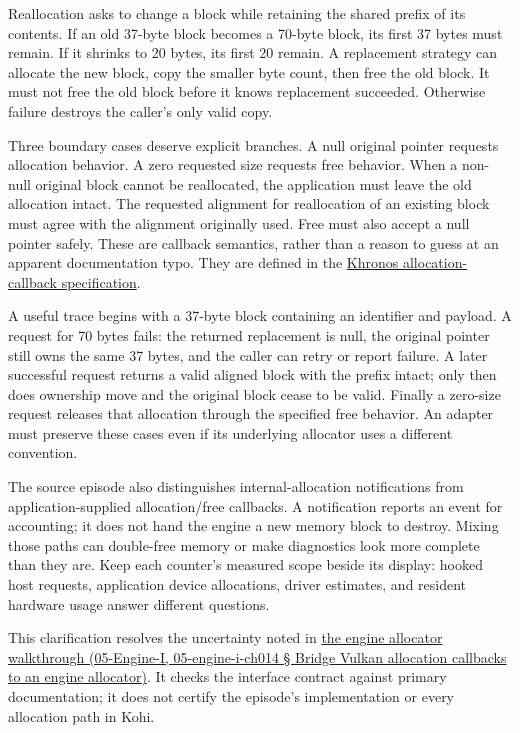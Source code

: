 Reallocation asks to change a block while retaining the shared prefix of its contents. If an old 37-byte block becomes a 70-byte block, its first 37 bytes must remain. If it shrinks to 20 bytes, its first 20 remain. A replacement strategy can allocate the new block, copy the smaller byte count, then free the old block. It must not free the old block before it knows replacement succeeded. Otherwise failure destroys the caller's only valid copy.

Three boundary cases deserve explicit branches. A null original pointer requests allocation behavior. A zero requested size requests free behavior. When a non-null original block cannot be reallocated, the application must leave the old allocation intact. The requested alignment for reallocation of an existing block must agree with the alignment originally used. Free must also accept a null pointer safely. These are callback semantics, rather than a reason to guess at an apparent documentation typo. They are defined in the \href{https://docs.vulkan.org/spec/latest/chapters/memory.html}{Khronos allocation-callback specification}.

A useful trace begins with a 37-byte block containing an identifier and payload. A request for 70 bytes fails: the returned replacement is null, the original pointer still owns the same 37 bytes, and the caller can retry or report failure. A later successful request returns a valid aligned block with the prefix intact; only then does ownership move and the original block cease to be valid. Finally a zero-size request releases that allocation through the specified free behavior. An adapter must preserve these cases even if its underlying allocator uses a different convention.

The source episode also distinguishes internal-allocation notifications from application-supplied allocation/free callbacks. A notification reports an event for accounting; it does not hand the engine a new memory block to destroy. Mixing those paths can double-free memory or make diagnostics look more complete than they are. Keep each counter's measured scope beside its display: hooked host requests, application device allocations, driver estimates, and resident hardware usage answer different questions.

This clarification resolves the uncertainty noted in \href{}{the engine allocator walkthrough (05-Engine-I, 05-engine-i-ch014 § Bridge Vulkan allocation callbacks to an engine allocator)}. It checks the interface contract against primary documentation; it does not certify the episode's implementation or every allocation path in Kohi.

